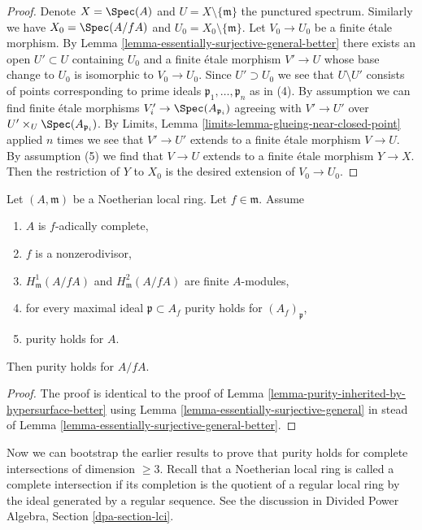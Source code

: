 \begin{proof}
Denote $X = \Spec(A)$ and $U = X \setminus \{\mathfrak m\}$
the punctured spectrum. Similarly we have $X_0 = \Spec(A/fA)$
and $U_0 = X_0 \setminus \{\mathfrak m\}$.
Let $V_0 \to U_0$ be a finite \'etale morphism. By
Lemma \ref{lemma-essentially-surjective-general-better}
there exists an open $U' \subset U$ containing $U_0$ and
a finite \'etale morphism $V' \to U$ whose base change to $U_0$
is isomorphic to $V_0 \to U_0$. Since $U' \supset U_0$
we see that $U \setminus U'$ consists of points corresponding
to prime ideals $\mathfrak p_1, \ldots, \mathfrak p_n$ as in (4).
By assumption we can find finite \'etale morphisms
$V'_i \to \Spec(A_{\mathfrak p_i})$ agreeing with
$V' \to U'$ over $U' \times_U \Spec(A_{\mathfrak p_i})$.
By Limits, Lemma \ref{limits-lemma-glueing-near-closed-point}
applied $n$ times we see that $V' \to U'$ extends to a finite \'etale
morphism $V \to U$. By assumption (5) we find that $V \to U$ extends
to a finite \'etale morphism $Y \to X$. Then the restriction of
$Y$ to $X_0$ is the desired extension of $V_0 \to U_0$.
\end{proof}

\begin{lemma}
\label{lemma-purity-inherited-by-hypersurface}
Let $(A, \mathfrak m)$ be a Noetherian local ring.
Let $f \in \mathfrak m$. Assume
\begin{enumerate}
\item $A$ is $f$-adically complete,
\item $f$ is a nonzerodivisor,
\item $H^1_\mathfrak m(A/fA)$ and $H^2_\mathfrak m(A/fA)$ are finite
$A$-modules,
\item for every maximal ideal $\mathfrak p \subset A_f$
purity holds for $(A_f)_\mathfrak p$,
\item purity holds for $A$.
\end{enumerate}
Then purity holds for $A/fA$.
\end{lemma}

\begin{proof}
The proof is identical to the proof of
Lemma \ref{lemma-purity-inherited-by-hypersurface-better}
using
Lemma \ref{lemma-essentially-surjective-general}
in stead of
Lemma \ref{lemma-essentially-surjective-general-better}.
\end{proof}

\noindent
Now we can bootstrap the earlier results to prove that
purity holds for complete intersections of dimension $\geq 3$.
Recall that a Noetherian local ring is called a complete
intersection if its completion is the quotient of a
regular local ring by the ideal generated by a regular sequence.
See the discussion in Divided Power Algebra, Section \ref{dpa-section-lci}.


